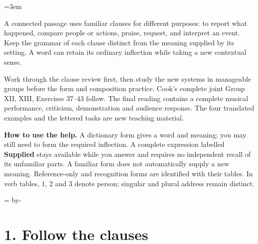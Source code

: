 \BookRecto
\begingroup
\renewcommand{\runningtitle}{Unit 17. Exposition and praise}
\emergencystretch=3em
\newcommand{\itempara}[2]{\par\addvspace{3pt}\noindent\hangindent=1.8em\hangafter=1\makebox[1.8em][l]{#1.}#2\par}
\newcommand{\reserve}[1]{\par\penalty-100\begingroup\dimen0=\pagegoal\advance\dimen0 by-\pagetotal\ifdim\dimen0<#1\newpage\fi\endgroup}

\raggedright
{}

A connected passage uses familiar clauses for different purposes: to report what happened, compare people or actions, praise, request, and interpret an event. Keep the grammar of each clause distinct from the meaning supplied by its setting. A word can retain its ordinary inflection while taking a new contextual sense.

Work through the clause review first, then study the new systems in manageable groups before the form and composition practice. Cook’s complete joint Group XII, XIII, Exercises 37–43 follow. The final reading contains a complete musical performance, criticism, demonstration and audience response. The four translated examples and the lettered tasks are new teaching material.

\textbf{How to use the help.} A dictionary form gives a word and meaning; you may still need to form the required inflection. A complete expression labelled \textbf{Supplied} stays available while you answer and requires no independent recall of its unfamiliar parts. A familiar form does not automatically supply a new meaning. Reference-only and recognition forms are identified with their tables. In verb tables, 1, 2 and 3 denote person; singular and plural address remain distinct.

\reserve{7\baselineskip}
\section*{1. Follow the clauses}

